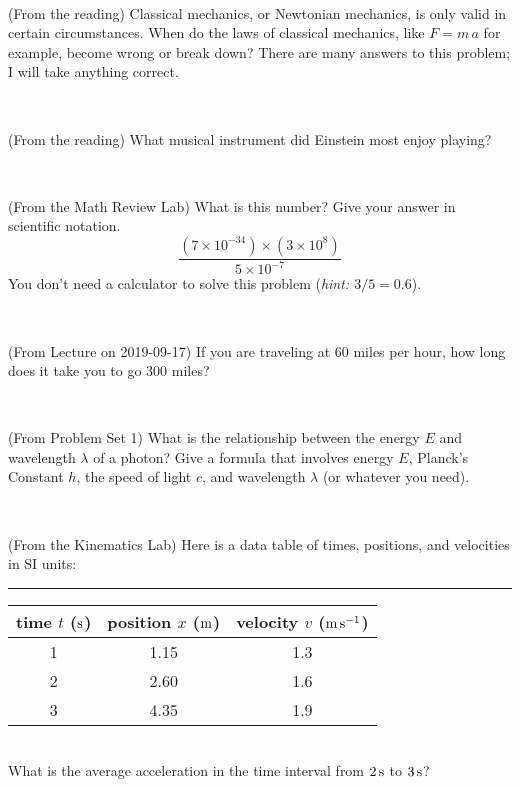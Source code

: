 \documentclass[12pt, letterpaper]{article}
\begin{document}
\vfill ~

\begin{problem} (From the reading)
Classical mechanics, or Newtonian mechanics, is only valid in certain
circumstances. When do the laws of classical mechanics, like $F =
m\,a$ for example, become wrong or break down? There are many answers
to this problem; I will take anything correct.
\end{problem}


\vfill ~

\begin{problem} (From the reading)
What musical instrument did Einstein most enjoy playing?
\end{problem}


\vfill ~


\clearpage


\begin{problem} (From the Math Review Lab)
What is this number? Give your answer in scientific notation.
$$
\frac{(7\times10^{-34})\times(3\times10^8)}{5\times10^{-7}}
$$
You don't need a calculator to solve this problem (\textit{hint: $3/5=0.6$}).
\end{problem}


\vfill ~

\begin{problem} (From Lecture on 2019-09-17)
If you are traveling at 60 miles per hour, how long does
it take you to go 300 miles?
\end{problem}


\vfill ~

\begin{problem} (From Problem Set 1)
What is the relationship between the energy $E$ and wavelength
$\lambda$ of a photon? Give a formula that involves energy $E$,
Planck's Constant $h$, the speed of light $c$, and wavelength
$\lambda$ (or whatever you need).
\end{problem}

\vfill ~

\begin{problem} (From the Kinematics Lab)
Here is a data table of times, positions, and velocities in SI units:\\
\rule{1.0in}{0pt}\begin{tabular}{c|c|c}
time $t$ ($\mathrm{s}$) & position $x$ ($\mathrm{m}$) & velocity $v$ ($\mathrm{m}\,\mathrm{s}^{-1}$) \\
\hline
1 & 1.15 & 1.3 \\
2 & 2.60 & 1.6 \\
3 & 4.35 & 1.9 \\
\hline
\end{tabular}\\
What is the average acceleration in the time interval from $2\,\mathrm{s}$ to $3\,\mathrm{s}$?
\end{problem}
\end{document}
